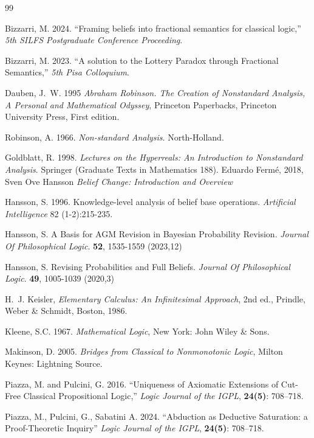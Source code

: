 \documentclass[12pt,a4paper,reqno]{amsart}
\theoremstyle{definition}
\begin{document}
\newpage
\begin{thebibliography}{99}

Bizzarri, M. 2024. “Framing beliefs into fractional semantics for classical logic,” \textit{5th SILFS Postgraduate Conference Proceeding}.

Bizzarri, M. 2023. “A solution to the Lottery Paradox through Fractional Semantics,” \textit{5th Pisa Colloquium}.

Dauben, J.~W. 1995 \textit{Abraham Robinson. The Creation of Nonstandard Analysis, A Personal and Mathematical Odyssey}, Princeton Paperbacks, Princeton University Press, First edition.



Robinson, A. 1966. \textit{Non-standard Analysis}. North-Holland.

Goldblatt, R. 1998. \textit{Lectures on the Hyperreals: An Introduction to Nonstandard Analysis}. Springer (Graduate Texts in Mathematics 188).
 Eduardo Ferm\'e, 2018, Sven Ove Hansson \textit{Belief Change: Introduction and Overview}

 Hansson, S. 1996. Knowledge-level analysis of belief base operations. \textit{Artificial Intelligence} 82 (1-2):215-235.

 Hansson, S. A Basis for AGM Revision in Bayesian Probability Revision. {\em Journal Of Philosophical Logic}. \textbf{52}, 1535-1559 (2023,12)

 Hansson, S. Revising Probabilities and Full Beliefs. {\em Journal Of Philosophical Logic}. \textbf{49}, 1005-1039 (2020,3)

H.~J. Keisler, \textit{Elementary Calculus: An Infinitesimal Approach}, 2nd ed., Prindle, Weber \& Schmidt, Boston, 1986.

Kleene, S.C. 1967. \textit{Mathematical Logic}, New York: John Wiley \& Sons.


Makinson, D. 2005. \textit{Bridges from Classical to Nonmonotonic Logic}, Milton Keynes: Lightning Source.

Piazza, M. and Pulcini, G. 2016. “Uniqueness of Axiomatic Extensions of Cut-Free Classical Propositional Logic,” \textit{Logic Journal of the IGPL}, \textbf{24(5)}: 708–718.

Piazza, M., Pulcini, G., Sabatini A. 2024. “Abduction as Deductive Saturation: a Proof-Theoretic Inquiry” \textit{Logic Journal of the IGPL}, \textbf{24(5)}: 708–718.


\end{thebibliography}
\end{document}

